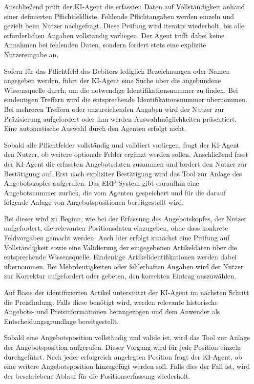 Anschließend prüft der \ac{KI}-Agent die erfassten Daten auf Vollständigkeit anhand einer definierten Pflichtfeldliste. Fehlende Pflichtangaben werden einzeln und gezielt beim Nutzer nachgefragt. Diese Prüfung wird iterativ wiederholt, bis alle erforderlichen Angaben vollständig vorliegen. Der Agent trifft dabei keine Annahmen bei fehlenden Daten, sondern fordert stets eine explizite Nutzereingabe an.

Sofern für das Pflichtfeld des Debitors lediglich Bezeichnungen oder Namen angegeben werden, führt der \ac{KI}-Agent eine Suche über die angebundene Wissensquelle durch, um die notwendige Identifikationsnummer zu finden. Bei eindeutigen Treffern wird die entsprechende Identifikationsnummer übernommen. Bei mehreren Treffern oder unzureichenden Angaben wird der Nutzer zur Präzisierung aufgefordert oder ihm werden Auswahlmöglichkeiten präsentiert. Eine automatische Auswahl durch den Agenten erfolgt nicht.

Sobald alle Pflichtfelder vollständig und validiert vorliegen, fragt der \ac{KI}-Agent den Nutzer, ob weitere optionale Felder ergänzt werden sollen. Anschließend fasst der \ac{KI}-Agent die erfassten Angebotsdaten zusammen und fordert den Nutzer zur Bestätigung auf. Erst nach expliziter Bestätigung wird das Tool zur Anlage des Angebotskopfes aufgerufen. Das \ac{ERP}-System gibt daraufhin eine Angebotsnummer zurück, die vom Agenten gespeichert und für die darauf folgende Anlage von Angebotspositionen bereitgestellt wird.

Bei dieser wird zu Beginn, wie bei der Erfassung des Angebotskopfes, der Nutzer aufgefordert, die relevanten Positionsdaten einzugeben, ohne dass konkrete Feldvorgaben gemacht werden. Auch hier erfolgt zunächst eine Prüfung auf Vollständigkeit sowie eine Validierung der eingegebenen Artikeldaten über die entsprechende Wissensquelle. Eindeutige Artikelidentifikationen werden dabei übernommen. Bei Mehrdeutigkeiten oder fehlerhaften Angaben wird der Nutzer zur Korrektur aufgefordert oder gebeten, den korrekten Eintrag auszuwählen.

Auf Basis der identifizierten Artikel unterstützt der \ac{KI}-Agent im nächsten Schritt die Preisfindung. Falls diese benötigt wird, werden relevante historische Angebots- und Preisinformationen herangezogen und dem Anwender als Entscheidungsgrundlage bereitgestellt.

Sobald eine Angebotsposition vollständig und valide ist, wird das Tool zur Anlage der Angebotsposition aufgerufen. Dieser Vorgang wird für jede Position einzeln durchgeführt. Nach jeder erfolgreich angelegten Position fragt der \ac{KI}-Agent, ob eine weitere Angebotsposition hinzugefügt werden soll. Falls dies der Fall ist, wird der beschriebene Ablauf für die Positionserfassung wiederholt.

